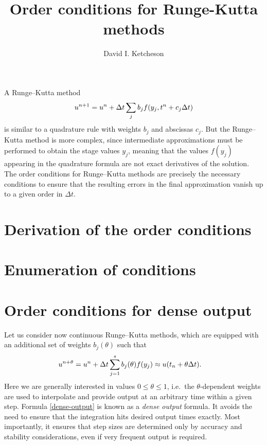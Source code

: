 \documentclass[12pt]{article}
\begin{document}
\title{Order conditions for Runge-Kutta methods}
\author{David I. Ketcheson} 
\maketitle



A Runge--Kutta method 
$$
u^{n+1} = u^n + \Delta t \sum_j b_j f(y_j, t^n + c_j \Delta t)
$$
is similar to a quadrature rule with weights $b_j$ and
abscissas $c_j$.  But the Runge--Kutta method is more complex, since 
intermediate approximations must be performed to obtain the stage values
$y_j$, meaning that the values $f(y_j)$ appearing in the quadrature formula
are not exact derivatives of the
solution.  The order conditions for Runge--Kutta methods are precisely 
the necessary conditions to ensure that the resulting errors in the final
approximation vanish up to a given order in $\Delta t$.

\section{Derivation of the order conditions\label{sec:rkoc}}
  

\section{Enumeration of conditions}
  

\section{Order conditions for dense output}
Let us consider now continuous Runge--Kutta methods, which are equipped
with an additional set of weights $b_j(\theta)$ such that
\begin{align} \label{dense-output}
    u^{n+\theta} & = u^n + \Delta t \sum_{j=1}^s b_j(\theta) f(y_j) \approx u(t_n + \theta \Delta t).
\end{align}
Here we are generally interested in values $0\le \theta \le 1$, i.e.\ the
$\theta$-dependent weights are used to interpolate and provide output
at an arbitrary time within a given step.  Formula \eqref{dense-output}
is known as a {\em dense output} formula.  It avoids the need to ensure
that the integration hits desired output times exactly.  Most importantly,
it ensures that step sizes are determined only by accuracy and stability
considerations, even if very frequent output is required.
\end{document}
